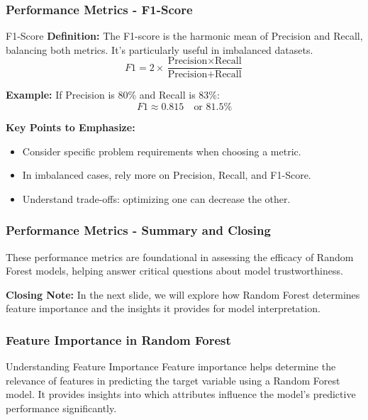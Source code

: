 \documentclass[aspectratio=169]{beamer}
\begin{document}
\begin{frame}[fragile]
    \frametitle{Performance Metrics - F1-Score}
    \begin{block}{F1-Score}
        \textbf{Definition:} The F1-score is the harmonic mean of Precision and Recall, balancing both metrics. It’s particularly useful in imbalanced datasets.
        \begin{equation}
            F1 = 2 \times \frac{\text{Precision} \times \text{Recall}}{\text{Precision} + \text{Recall}}
        \end{equation}
        
        \textbf{Example:} If Precision is 80\% and Recall is 83\%:
        \begin{equation}
            F1 \approx 0.815 \quad \text{or } 81.5\%
        \end{equation}
    \end{block}

    \textbf{Key Points to Emphasize:}
    \begin{itemize}
        \item Consider specific problem requirements when choosing a metric.
        \item In imbalanced cases, rely more on Precision, Recall, and F1-Score.
        \item Understand trade-offs: optimizing one can decrease the other.
    \end{itemize}
\end{frame}

\begin{frame}[fragile]
    \frametitle{Performance Metrics - Summary and Closing}
    These performance metrics are foundational in assessing the efficacy of Random Forest models, helping answer critical questions about model trustworthiness.

    \textbf{Closing Note:} 
    In the next slide, we will explore how Random Forest determines feature importance and the insights it provides for model interpretation.
\end{frame}

\begin{frame}[fragile]
    \frametitle{Feature Importance in Random Forest}
    \begin{block}{Understanding Feature Importance}
        Feature importance helps determine the relevance of features in predicting the target variable using a Random Forest model. It provides insights into which attributes influence the model's predictive performance significantly.
    \end{block}
\end{frame}
\end{document}
